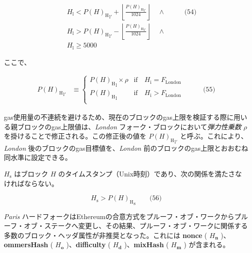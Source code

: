 \documentclass[
]{ltjsarticle}
\begin{document}
\protect\hypertarget{eq-54}{}{}

\[\begin{aligned}
& & H_{\mathrm{l}} < {P(H)_{\mathrm{H}}}_{\mathrm{l}'} + \left\lfloor\frac{{P(H)_{\mathrm{H}}}_{\mathrm{l}'}}{1024}\right\rfloor \quad \wedge & \qquad \text{(54)} \\
& & H_{\mathrm{l}} > {P(H)_{\mathrm{H}}}_{\mathrm{l}'} - \left\lfloor\frac{{P(H)_{\mathrm{H}}}_{\mathrm{l}'}}{1024}\right\rfloor \quad \wedge \\
& & H_{\mathrm{l}} \geqslant 5000
\end{aligned}\]

ここで、

\protect\hypertarget{eq-55}{}{}

\[\begin{aligned}
{P(H)_{\mathrm{H}}}_{\mathrm{l}'} &\equiv \begin{cases}
      {P(H)_{\mathrm{H}}}_{\mathrm{l}} \times \rho &  \text{if} \quad H_{\mathrm{i}} = F_{\mathrm{London}} \\
      {P(H)_{\mathrm{H}}}_{\mathrm{l}} &  \text{if} \quad H_{\mathrm{i}} > F_{\mathrm{London}} \\
  \end{cases} & \qquad \text{(55)}
\end{aligned}\]

gas使用量の不連続を避けるため、現在のブロックのgas上限を検証する際に用いる親ブロックのgas上限値は、\emph{London}
フォーク・ブロックにおいて\emph{弾力性乗数} \(\rho\)
を掛けることで修正される。この修正後の値を
\({P(H)_{\mathrm{H}}}_{\mathrm{l}'}\) と呼ぶ。これにより、\emph{London}
後のブロックのgas目標値を、\emph{London}
前のブロックのgas上限とおおむね同水準に設定できる。

\hypertarget{block_timestamp_H__s}{}

\(H_{\mathrm{s}}\) はブロック \(H\)
のタイムスタンプ（Unix時刻）であり、次の関係を満たさなければならない。

\protect\hypertarget{eq-56}{}{}

\[H_{\mathrm{s}} > {P(H)_{\mathrm{H}}}_{\mathrm{s}} \qquad \text{(56)}\]

\emph{Paris}
ハードフォークはEthereumの合意方式をプルーフ・オブ・ワークからプルーフ・オブ・ステークへ変更し、その結果、プルーフ・オブ・ワークに関係する多数のブロック・ヘッダ属性が非推奨となった。これには
\textbf{nonce} ( \(H_{\mathbf{n}}\) )、\textbf{ommersHash} (
\(H_{\mathbf{o}}\) )、\textbf{difficulty} ( \(H_{\mathbf{d}}\)
)、\textbf{mixHash} ( \(H_{\mathbf{m}}\) ) が含まれる。
\end{document}

